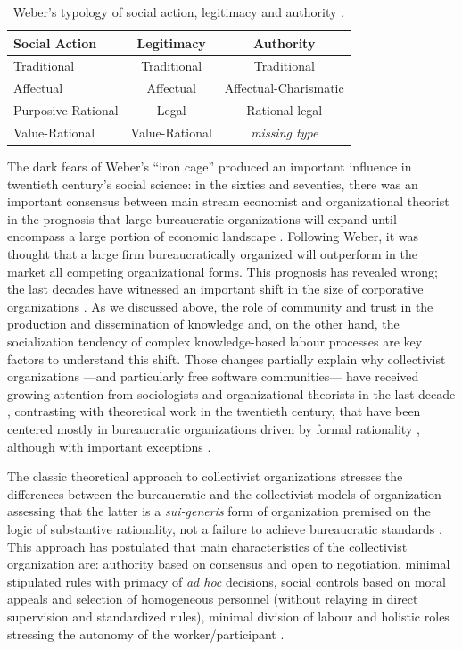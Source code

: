 \begin{center}
\begin{table}[h]
\begin{tabular}{l c c}
\hline
Social Action&Legitimacy&Authority\\
\hline
Traditional&Traditional&Traditional\\
Affectual&Affectual&Affectual-Charismatic\\
Purposive-Rational&Legal&Rational-legal\\
Value-Rational&Value-Rational&\emph{missing type}\\
\hline
\end{tabular}
\caption[Weber's typology of social action, legitimacy and authority.]{Weber's typology of social action, legitimacy and authority \citep[526]{satow:1975}.}
\label{weber}
\end{table}
\end{center}

The dark fears of Weber's ``iron cage'' produced an important influence in twentieth century's social science: in the sixties and seventies, there was an important consensus between main stream economist and organizational theorist in the prognosis that large bureaucratic organizations will expand until encompass a large portion of economic landscape \citep[215]{adler:2001}. Following Weber, it was thought that a large firm bureaucratically organized will outperform in the market all competing organizational forms. This prognosis has revealed wrong; the last decades have witnessed an important shift in the size of corporative organizations \citep{brynjolfsson:1994}. As we discussed above, the role of community and trust in the production and dissemination of knowledge and, on the other hand, the socialization tendency of complex knowledge-based labour processes are key factors to understand this shift. Those changes partially explain why collectivist organizations ---and particularly free software communities--- have received growing attention from sociologists and organizational theorists in the last decade \citep{kogut:2001,hippel:2003,weber:2004,omahony:2007}, contrasting with theoretical work in the twentieth century, that have been centered mostly in bureaucratic organizations driven by formal rationality \citep{thompson:2003}, although with important exceptions \citep{johnson:1977,rothschild:1979,rothschild:1989}.

The classic theoretical approach to collectivist organizations \citep{rothschild:1979,rothschild:1989} stresses the differences between the bureaucratic and the collectivist models of organization assessing that the latter is a \emph{sui-generis} form of organization premised on the logic of substantive rationality, not a failure to achieve bureaucratic standards \citep[509]{rothschild:1979}. This approach has postulated that main characteristics of the collectivist organization are: authority based on consensus and open to negotiation, minimal stipulated rules with primacy of \emph{ad hoc} decisions, social controls based on moral appeals and selection of homogeneous personnel (without relaying in direct supervision and standardized rules), minimal division of labour and holistic roles stressing the autonomy of the worker/participant \citep[519]{rothschild:1979}. 

